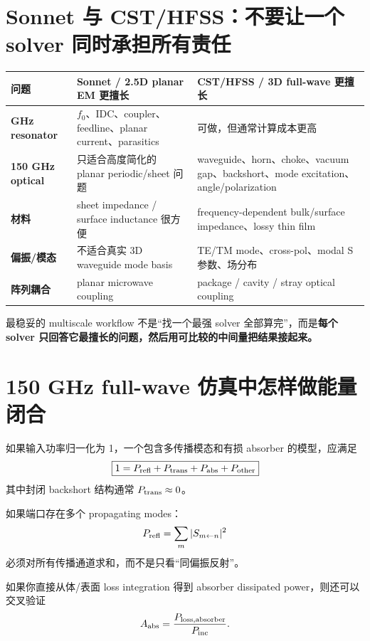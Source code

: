 \documentclass[11pt,a4paper,openany]{ctexrep}
\begin{document}
\section{Sonnet 与 CST/HFSS：不要让一个 solver 同时承担所有责任}

\begin{center}
\begin{tabularx}{0.96\linewidth}{>{\bfseries}p{28mm}XX}
\toprule
问题 & Sonnet / 2.5D planar EM 更擅长 & CST/HFSS / 3D full-wave 更擅长 \\
\midrule
GHz resonator & $f_0$、IDC、coupler、feedline、planar current、parasitics & 可做，但通常计算成本更高 \\
150 GHz optical & 只适合高度简化的 planar periodic/sheet 问题 & waveguide、horn、choke、vacuum gap、backshort、mode excitation、angle/polarization \\
材料 & sheet impedance / surface inductance 很方便 & frequency-dependent bulk/surface impedance、lossy thin film \\
偏振/模态 & 不适合真实 3D waveguide mode basis & TE/TM mode、cross-pol、modal S 参数、场分布 \\
阵列耦合 & planar microwave coupling & package / cavity / stray optical coupling \\
\bottomrule
\end{tabularx}
\end{center}

\begin{intuitionbox}
最稳妥的 multiscale workflow 不是“找一个最强 solver 全部算完”，而是\textbf{每个 solver 只回答它最擅长的问题，然后用可比较的中间量把结果接起来。}
\end{intuitionbox}

\section{150 GHz full-wave 仿真中怎样做能量闭合}

如果输入功率归一化为 1，一个包含多传播模态和有损 absorber 的模型，应满足
\[
\boxed{
1=P_{\rm refl}+P_{\rm trans}+P_{\rm abs}+P_{\rm other}
}
\]
其中封闭 backshort 结构通常 $P_{\rm trans}\approx0$。

如果端口存在多个 propagating modes：
\[
P_{\rm refl}=\sum_m |S_{m\leftarrow n}|^2
\]
必须对所有传播通道求和，而不是只看“同偏振反射”。

如果你直接从体/表面 loss integration 得到 absorber dissipated power，则还可以交叉验证
\[
A_{\rm abs}=\frac{P_{\rm loss,absorber}}{P_{\rm inc}}.
\]
\end{document}
